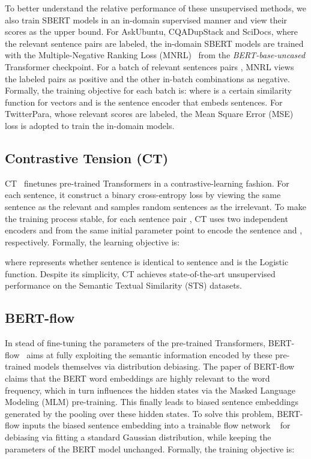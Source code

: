 \documentclass[11pt,a4paper]{article}
\begin{document}
To better understand the relative performance of these unsupervised methods, we also train SBERT models in an in-domain supervised manner and view their scores as the upper bound. For AskUbuntu, CQADupStack and SciDocs, where the relevant sentence pairs are labeled, the in-domain SBERT models are trained with the Multiple-Negative Ranking Loss (MNRL)~\citep{DBLP:journals/corr/HendersonASSLGK17} from the \textit{BERT-base-uncased} Transformer checkpoint. For a batch of relevant sentences pairs , MNRL views the labeled pairs as positive and the other in-batch combinations as negative. Formally, the training objective for each batch is:
where  is a certain similarity function for vectors and  is the sentence encoder that embeds sentences. For TwitterPara, whose relevant scores are labeled, the Mean Square Error (MSE) loss is adopted to train the in-domain models.


\subsection{Contrastive Tension (CT)}
CT~\citep{carlsson2021semantic} finetunes pre-trained Transformers in a contrastive-learning fashion. For each sentence, it construct a binary cross-entropy loss by viewing the same sentence as the relevant and samples  random sentences as the irrelevant.  To make the training process stable, for each sentence pair , CT uses two independent encoders  and  from the same initial parameter point to encode the sentence  and , respectively. Formally, the learning objective is:

where  represents whether sentence  is identical to sentence  and  is the Logistic function. Despite its simplicity, CT achieves state-of-the-art unsupervised performance on the Semantic Textual Similarity (STS) datasets.

\subsection{BERT-flow}
In stead of fine-tuning the parameters of the pre-trained Transformers, BERT-flow~\citep{DBLP:conf/emnlp/LiZHWYL20} aims at fully exploiting the semantic information encoded by these pre-trained models themselves via distribution debiasing. The paper of BERT-flow claims that the BERT word embeddings are highly relevant to the word frequency, which in turn influences the hidden states via the Masked Language Modeling (MLM) pre-training. This finally leads to biased sentence embeddings generated by the pooling over these hidden states. To solve this problem, BERT-flow inputs the biased sentence embedding into a trainable flow network ~\citep{DBLP:conf/nips/KingmaD18} for debiasing via fitting a standard Gaussian distribution, while keeping the parameters of the BERT model unchanged. Formally, the training objective is:
\end{document}
